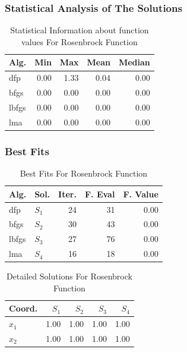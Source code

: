 \documentclass[conference]{IEEEtran}
\begin{document}
\subsubsection{Statistical Analysis of The Solutions}
\label{statisticalanalysisrosenbrock2d2D}

\begin{table}[H]
\centering
\caption{Statistical Information about function values For Rosenbrock Function}
\label{function_values:rosenbrock2d}
\begin{tabular}{lrrrr}
\toprule
 Alg. &  Min &  Max &  Mean &  Median \\
\midrule
  dfp & 0.00 & 1.33 &  0.04 &    0.00 \\
 bfgs & 0.00 & 0.00 &  0.00 &    0.00 \\
lbfgs & 0.00 & 0.00 &  0.00 &    0.00 \\
  lma & 0.00 & 0.00 &  0.00 &    0.00 \\
\bottomrule
\end{tabular}
\end{table}

\subsubsection{Best Fits}
\label{bestfitsrosenbrock2d2D}

\begin{table}[H]
\centering
\caption{Best Fits For Rosenbrock Function}
\label{solutions:rosenbrock2d}
\begin{tabular}{llrrr}
\toprule
 Alg. &    Sol. &  Iter. &  F. Eval &  F. Value \\
\midrule
  dfp & $S_{1}$ &     24 &       31 &      0.00 \\
 bfgs & $S_{2}$ &     30 &       43 &      0.00 \\
lbfgs & $S_{3}$ &     27 &       76 &      0.00 \\
  lma & $S_{4}$ &     16 &       18 &      0.00 \\
\bottomrule
\end{tabular}
\end{table}

\begin{table}[H]
\centering
\caption{Detailed Solutions For Rosenbrock Function}
\label{detailedsolutions:rosenbrock2d}
\begin{tabular}{lrrrr}
\toprule
 Coord. &  $S_{1}$ &  $S_{2}$ &  $S_{3}$ &  $S_{4}$ \\
\midrule
$x_{1}$ &     1.00 &     1.00 &     1.00 &     1.00 \\
$x_{2}$ &     1.00 &     1.00 &     1.00 &     1.00 \\
\bottomrule
\end{tabular}
\end{table}
\end{document}
